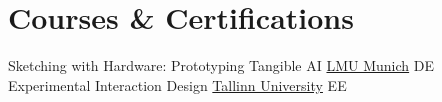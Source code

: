 \section{Courses \& Certifications}

{Sketching with Hardware: Prototyping Tangible AI}
{\href{https://www.lmu.de/en/}{\color{blue}LMU Munich}}
{DE}
{}
{Experimental Interaction Design}
{\href{https://summerschool.tlu.ee/experimental-interaction-design/}{\color{blue}Tallinn University}}
{EE}
{}
